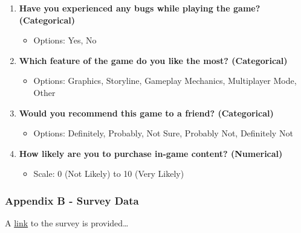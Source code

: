 \documentclass[
  letterpaper,
  DIV=11,
  numbers=noendperiod]{scrartcl}
\providecommand{\tightlist}{%
  \setlength{\itemsep}{0pt}\setlength{\parskip}{0pt}}\usepackage{longtable,booktabs,array}
\begin{document}
\begin{enumerate}
\def\labelenumi{\arabic{enumi}.}
\setcounter{enumi}{4}
\tightlist
\item
  \textbf{Have you experienced any bugs while playing the game?
  (Categorical)}

  \begin{itemize}
  \tightlist
  \item
    Options: Yes, No
  \end{itemize}
\item
  \textbf{Which feature of the game do you like the most? (Categorical)}

  \begin{itemize}
  \tightlist
  \item
    Options: Graphics, Storyline, Gameplay Mechanics, Multiplayer Mode,
    Other
  \end{itemize}
\item
  \textbf{Would you recommend this game to a friend? (Categorical)}

  \begin{itemize}
  \tightlist
  \item
    Options: Definitely, Probably, Not Sure, Probably Not, Definitely
    Not
  \end{itemize}
\item
  \textbf{How likely are you to purchase in-game content? (Numerical)}

  \begin{itemize}
  \tightlist
  \item
    Scale: 0 (Not Likely) to 10 (Very Likely)
  \end{itemize}
\end{enumerate}

\subsubsection{Appendix B - Survey Data}\label{appendix-b---survey-data}

A \href{www.dkit.ie}{link} to the survey is provided\ldots{}
\end{document}
